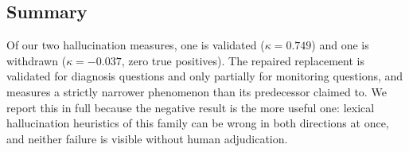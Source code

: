 \subsection{Summary}

Of our two hallucination measures, one is validated
($\kappa = 0.749$) and one is withdrawn ($\kappa = -0.037$, zero true
positives). The repaired replacement is validated for diagnosis questions and
only partially for monitoring questions, and measures a strictly narrower
phenomenon than its predecessor claimed to. We report this in full because the
negative result is the more useful one: lexical hallucination heuristics of this
family can be wrong in both directions at once, and neither failure is visible
without human adjudication.
